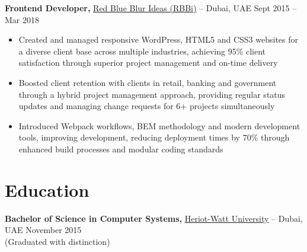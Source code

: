 \documentclass[10pt,letterpaper]{article}
\begin{document}
\textbf{Frontend Developer,} \href{https://www.rbbideas.com/}{Red Blue Blur Ideas (RBBi)} -- Dubai, UAE \hfill Sept 2015 -- Mar 2018 \\
\vspace{-5pt}
\begin{itemize}
  \item Created and managed responsive WordPress, HTML5 and CSS3 websites for a diverse client base across multiple industries, achieving 95\% client satisfaction through superior project management and on-time delivery
  \item Boosted client retention with clients in retail, banking and government through a hybrid project management approach, providing regular status updates and managing change requests for 6+ projects simultaneously
  \item Introduced Webpack workflows, BEM methodology and modern development tools, improving development, reducing deployment times by 70\% through enhanced build processes and modular coding standards
\end{itemize}


\vspace{-7pt}

\vspace{-9.5pt}
\section*{Education}
\textbf{Bachelor of Science in Computer Systems,} \href{https://www.hw.ac.uk/dubai}{Heriot-Watt University} -- Dubai, UAE \hfill November 2015 \\
(Graduated with distinction)

\end{document}
